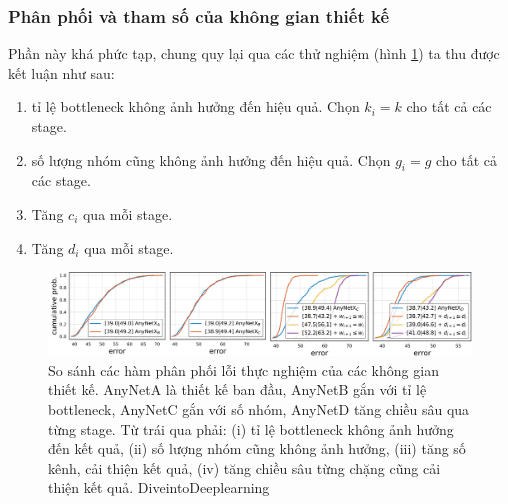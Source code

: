 \documentclass{article}
\begin{document}
\subsubsection{Phân phối và tham số của không gian thiết kế}
Phần này khá phức tạp, chung quy lại qua các thử nghiệm (hình \ref{fig21}) ta thu được kết luận như sau:
\begin{enumerate}
    \item tỉ lệ bottleneck không ảnh hưởng đến hiệu quả. Chọn $k_i = k$ cho tất cả các stage.
    \item số lượng nhóm cũng không ảnh hưởng đến hiệu quả. Chọn $g_i = g$ cho tất cả các stage.
    \item Tăng $c_i$ qua mỗi stage.
    \item Tăng $d_i$ qua mỗi stage.
\end{enumerate}
\begin{figure}
    \centering
    \includegraphics[width = 0.8\linewidth]{regnet-fig.png}
    \caption{So sánh các hàm phân phối lỗi thực nghiệm của các không gian thiết kế. AnyNetA là thiết kế ban đầu, AnyNetB gắn với tỉ lệ bottleneck, AnyNetC gắn với số nhóm, AnyNetD tăng chiều sâu qua từng stage. Từ trái qua phải: (i) tỉ lệ bottleneck không ảnh hưởng đến kết quả, (ii) số lượng nhóm cũng không ảnh hưởng, (iii) tăng số kênh, cải thiện kết quả, (iv) tăng chiều sâu từng chặng cũng cải thiện kết quả. DiveintoDeeplearning}
    \label{fig21}
\end{figure}
\end{document}
